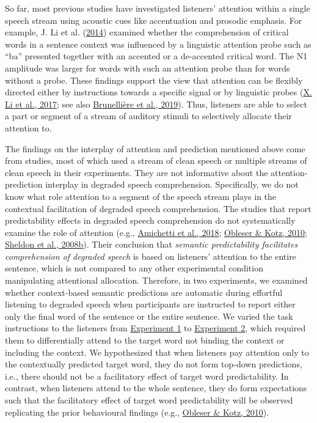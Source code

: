 \documentclass[a4paper, nobind]{templates/ociamthesis}
\begin{document}
So far, most previous studies have investigated listeners' attention within a single speech stream using acoustic cues like accentuation and prosodic emphasis.
For example, J. Li et al. (\protect\hyperlink{ref-Li2014}{2014}) examined whether the comprehension of critical words in a sentence context was influenced by a linguistic attention probe such as ``ba'' presented together with an accented or a de-accented critical word.
The N1 amplitude was larger for words with such an attention probe than for words without a probe.
These findings support the view that attention can be flexibly directed either by instructions towards a specific signal or by linguistic probes (\protect\hyperlink{ref-Li2017}{X. Li et al., 2017}; see also \protect\hyperlink{ref-Brunelliere2019}{Brunellière et al., 2019}).
Thus, listeners are able to select a part or segment of a stream of auditory stimuli to selectively allocate their attention to.

The findings on the interplay of attention and prediction mentioned above come from studies, most of which used a stream of clean speech or multiple streams of clean speech in their experiments.
They are not informative about the attention-prediction interplay in degraded speech comprehension.
Specifically, we do not know what role attention to a segment of the speech stream plays in the contextual facilitation of degraded speech comprehension.
The studies that report predictability effects in degraded speech comprehension do not systematically examine the role of attention (e.g., \protect\hyperlink{ref-Amichetti2018}{Amichetti et al., 2018}; \protect\hyperlink{ref-Obleser2010}{Obleser \& Kotz, 2010}; \protect\hyperlink{ref-Sheldon2008b}{Sheldon et al., 2008b}).
Their conclusion that \emph{semantic predictability facilitates comprehension of degraded speech} is based on listeners' attention to the entire sentence,
which is not compared to any other experimental condition manipulating attentional allocation.
Therefore, in two experiments, we examined whether context-based semantic predictions are automatic during effortful listening to degraded speech when participants are instructed to report either only the final word of the sentence or the entire sentence.
We varied the task instructions to the listeners from \protect\hyperlink{experiment1a}{Experiment 1} to \protect\hyperlink{experiment1b}{Experiment 2}, which required them to differentially attend to the target word not binding the context or including the context.
We hypothesized that when listeners pay attention only to the contextually predicted target word, they do not form top-down predictions, i.e., there should not be a facilitatory effect of target word predictability.
In contrast, when listeners attend to the whole sentence, they do form expectations such that the facilitatory effect of target word predictability will be observed replicating the prior behavioural findings (e.g., \protect\hyperlink{ref-Obleser2010}{Obleser \& Kotz, 2010}).
\end{document}
